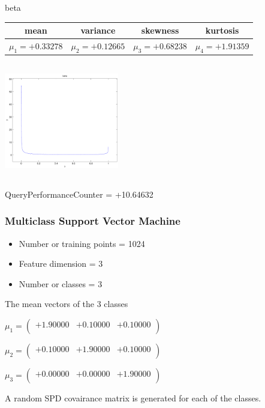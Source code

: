 \documentclass[9pt]{article}
\theoremstyle{plain}
\theoremstyle{definition}
\theoremstyle{remark}
\numberwithin{equation}{section}
\begin{document}
\newpage
beta \begin{tabular}{|c|c|c|c|}  mean & variance & skewness & kurtosis \\  \hline
$\mu_1 = +0.33278$ & $\mu_2 = +0.12665$ & $\mu_3 = +0.68238$ & $\mu_4 =+1.91359$ \\
\end{tabular}

\includegraphics[width=5cm,height=5cm]{beta.pdf}

QueryPerformanceCounter  =  +10.64632
\subsubsection{Multiclass Support Vector Machine }
\begin{itemize}
\item Number or training points = 1024
\item Feature dimension = 3
\item Number or classes = 3
\end{itemize}
{The mean vectors of the 3 classes}

$\mu_1 = \left(
\begin{array}{
ccc}
+1.90000 & +0.10000 & +0.10000 \\
\end{array}
\right)$ \newline 

$\mu_2 = \left(
\begin{array}{
ccc}
+0.10000 & +1.90000 & +0.10000 \\
\end{array}
\right)$ \newline 

$\mu_3 = \left(
\begin{array}{
ccc}
+0.00000 & +0.00000 & +1.90000 \\
\end{array}
\right)$ \newline 

A random SPD covairance matrix is generated for each of the classes.\newline
\end{document}
